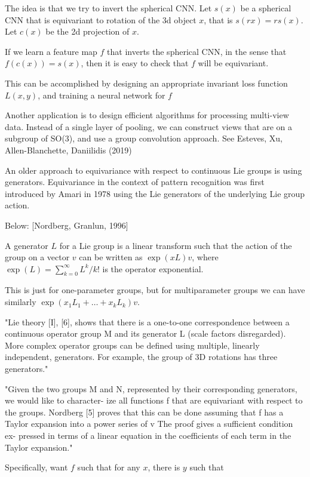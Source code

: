 \documentclass[english]{article}
\begin{document}
The idea is that we try to invert the spherical CNN. Let $s(x)$ be a spherical CNN that is equivariant to rotation of the 3d object $x$, that is $s(rx)=rs(x)$. Let $c(x)$ be the 2d projection of $x$. 

If we learn a feature map $f$ that inverts the spherical CNN, in the sense that $f(c(x))=s(x)$, then it is easy to check that $f$ will be equivariant. 

This can be accomplished by designing an appropriate invariant loss function $L(x,y)$, and training a neural network for $f$

\item Another application is to design efficient algorithms for processing multi-view data. Instead of a single layer of pooling, we can construct views that are on a subgroup of SO(3), and use a group convolution approach. See Esteves, Xu, Allen-Blanchette, Daniilidis (2019)

\item An older approach to equivariance with respect to continuous Lie groups is using generators. Equivariance in the context of pattern recognition was first introduced by Amari in 1978 using the Lie generators
of the underlying Lie group action.


Below: [Nordberg, Granlun, 1996]

A generator $L$ for a Lie group is a linear transform such that the action of the group on a vector $v$ can be written as $\exp(xL)v$, where $\exp(L) = \sum_{k=0}^\infty L^k/k!$ is the operator exponential. 

This is just for one-parameter groups, but for multiparameter groups we can have similarly $\exp(x_1L_1+\ldots+x_k L_k)v$.

"Lie theory [I], [6], shows that there is a one-to-one correspondence between a continuous operator group M
and its generator L (scale factors disregarded). More
complex operator groups can be defined using multiple, linearly independent, generators. For example, the
group of 3D rotations has three generators."

"Given the two groups M and N, represented by their
corresponding generators, we would like to character-
ize all functions f that are equivariant with respect to
the groups. Nordberg [5] proves that this can be done
assuming that f has a Taylor expansion into a power
series of v The proof gives a sufficient condition ex-
pressed in terms of a linear equation in the coefficients
of each term in the Taylor expansion."

Specifically, want $f$ such that for any $x$, there is $y$ such that
\end{document}

